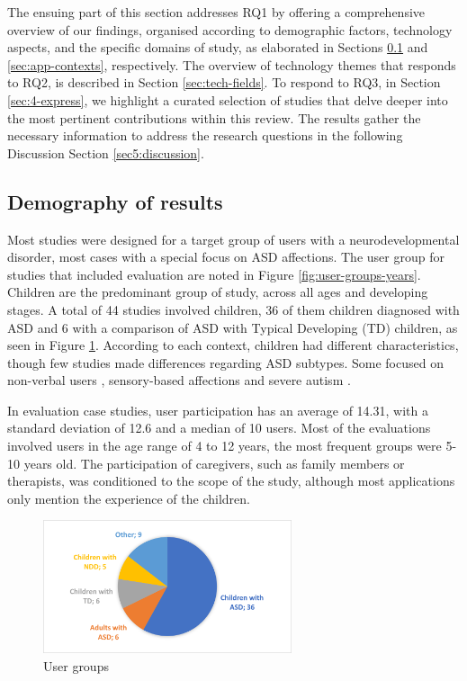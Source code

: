 \documentclass[a4paper,fleqn]{cas-sc}
\begin{document}
The ensuing part of this section addresses RQ1 by offering a comprehensive overview of our findings, organised according to demographic factors, technology aspects, and the specific domains of study, as elaborated in Sections \ref{sec4:results-dem} and \ref{sec:app-contexts}, respectively. The overview of technology themes that responds to RQ2, is described in Section  \ref{sec:tech-fields}. To respond to RQ3, in Section \ref{sec:4-express}, we highlight a curated selection of studies that delve deeper into the most pertinent contributions within this review. The results gather the necessary information to address the research questions in the following Discussion Section \ref{sec5:discussion}.

\subsection{Demography of results}
\label{sec4:results-dem}
Most studies were designed for a target group of users with a neurodevelopmental disorder, most cases with a special focus on ASD affections. The user group for studies that included evaluation are noted in Figure \ref{fig:user-groups-years}. Children are the predominant group of study, across all ages and developing stages. A total of 44 studies involved children, 36 of them children diagnosed with ASD and 6 with a comparison of ASD with Typical Developing (TD) children, as seen in Figure \ref{fig:user-groups-general}. According to each context, children had different characteristics, though few studies made differences regarding ASD subtypes. Some focused on non-verbal users \cite{McGowan17, Ragone22} , sensory-based affections \cite{MarquezSegura19} and severe autism \cite{Giraud21}.

In evaluation case studies, user participation has an average of 14.31, with a standard deviation of 12.6 and a median of 10 users. Most of the evaluations involved users in the age range of 4 to 12 years, the most frequent groups were 5-10 years old. The participation of caregivers, such as family members or therapists, was conditioned to the scope of the study, although most applications only mention the experience of the children.

\begin{figure}
	\includegraphics[width=0.65\textwidth]{fig2_user-group-general.png}
        \centering
	  \caption{User groups}
        \label{fig:user-groups-general}
\end{figure}
\end{document}
